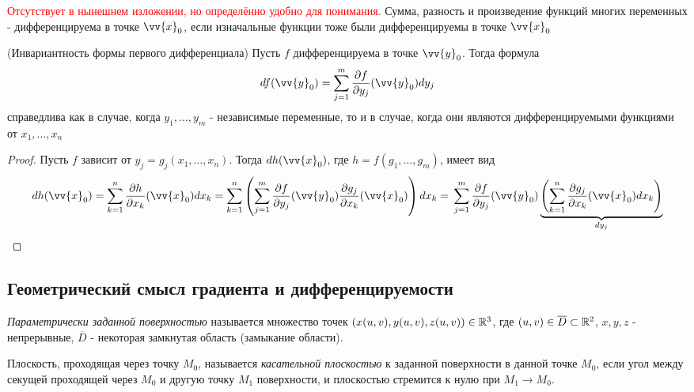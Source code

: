 \begin{corollary}
	\textcolor{red}{Отсутствует в нынешнем изложении, но определённо удобно для понимания.}
	Сумма, разность и произведение функций многих переменных - дифференцируема в точке $\vv{x}_0$, если изначальные функции тоже были дифференцируемы в точке $\vv{x}_0$
\end{corollary}

\begin{corollary} (Инвариантность формы первого дифференциала)
	Пусть $f$ дифференцируема в точке $\vv{y}_0$. Тогда формула
	\[
		df(\vv{y}_0) = \suml_{j = 1}^m \frac{\vdelta f}{\vdelta y_j} (\vv{y}_0) dy_j
	\]
	справедлива как в случае, когда $y_1, \ldots, y_m$ - независимые переменные, то и в случае, когда они являются дифференцируемыми функциями от $x_1, \ldots, x_n$
\end{corollary}

\begin{proof}
	Пусть $f$ зависит от $y_j = g_j(x_1, \ldots, x_n)$. Тогда $dh(\vv{x}_0)$, где $h = f(g_1, \ldots, g_m)$, имеет вид
	\[
		dh(\vv{x}_0) = \suml_{k = 1}^n \frac{\vdelta h}{\vdelta x_k} (\vv{x}_0) dx_k = \suml_{k = 1}^n \left(\suml_{j = 1}^m \frac{\vdelta f}{\vdelta y_j} (\vv{y}_0) \frac{\vdelta g_j}{\vdelta x_k} (\vv{x}_0)\right) dx_k =
		\\
		\suml_{j = 1}^m \frac{\vdelta f}{\vdelta y_j} (\vv{y}_0) \underbrace{\left(\suml_{k = 1}^n \frac{\vdelta g_j}{\vdelta x_k} (\vv{x}_0) dx_k\right)}_{dy_j}
	\]
\end{proof}

\subsection{Геометрический смысл градиента и дифференцируемости}

\begin{definition}
	\textit{Параметрически заданной поверхностью} называется множество точек $(x(u,v), y(u,v), z(u,v))\in\mathbb{R}^3$, где $(u,v ) \in\overline{D} \subset \mathbb{R}^2$, $x, y, z$ - непрерывные, $\overline{D}$ - некоторая замкнутая область (замыкание области).
\end{definition}

\begin{definition}
	Плоскость, проходящая через точку $M_0$, называется \textit{касательной плоскостью} к заданной поверхности в данной точке $M_0$, если угол между секущей проходящей через $M_0$ и другую точку $M_1$ поверхности, и плоскостью стремится к нулю при $M_1 \to M_0$.
\end{definition}

